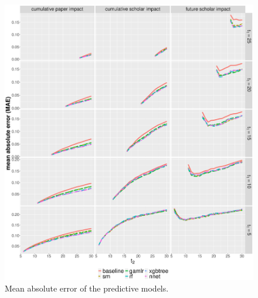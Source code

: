 \begin{refsection}
\begin{figure}[ht!]
    \centering
    \includegraphics[width=\textwidth]{figures/pred_model/mae.eps}
    \caption[MAE of the predictive models]{Mean absolute error of the predictive models.}
    \label{fig:pred_mae}
\end{figure}


\end{refsection}
